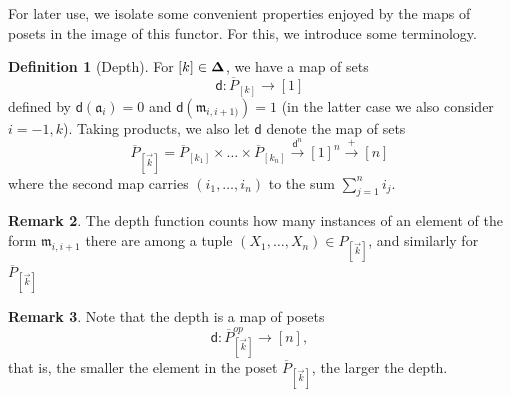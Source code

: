 \documentclass[10pt, reqno, twoside
, final
]{amsart}
\numberwithin{equation}{subsection}%
\theoremstyle{definition}
\newtheorem{defn}{Definition}[subsection]
\theoremstyle{definition}
\theoremstyle{definition}
\theoremstyle{definition}
\theoremstyle{definition}
\theoremstyle{definition}
\theoremstyle{definition}
\theoremstyle{definition}
\theoremstyle{definition}
\theoremstyle{plain}
\theoremstyle{definition}
\theoremstyle{plain}
\theoremstyle{definition}
\theoremstyle{plain}
\theoremstyle{definition}
\newtheorem{rmk}[defn]{Remark}
\theoremstyle{definition}
\theoremstyle{plain}
\theoremstyle{plain}
\theoremstyle{definition}
\theoremstyle{plain}
\theoremstyle{plain}
\theoremstyle{plain}
\begin{document}
For later use, we isolate some convenient properties enjoyed by the maps of posets in the image of this functor. For this, we introduce some terminology.
\begin{defn}[Depth]\label{defn:depth}
For $[k]\in\boldsymbol{\Delta}$, we have a map of sets
\[ \mathsf{d}:\overline{P}_{[k]}\longrightarrow [1] \]
defined by $\mathsf{d}(\mathfrak{a}_i)=0$ and $\mathsf{d}(\mathfrak{m}_{i, i+1)})=1$ (in the latter case we also consider $i=-1,k$). Taking products, we also let $\mathsf{d}$ denote the map of sets
\[ \overline{P}_{[\vec{k}]}=\overline{P}_{[k_1]}\times\ldots\times\overline{P}_{[k_n]}\overset{\mathsf{d}^n}{\longrightarrow} [1]^n\overset{+}{\longrightarrow} [n] \]
where the second map carries $(i_1,\ldots,i_n)$ to the sum $\sum_{j=1}^ni_j$.
\end{defn}
\begin{rmk}
The depth function counts how many instances of an element of the form $\mathfrak{m}_{i,i+1}$ there are among a tuple $(X_1,\ldots,X_n)\in P_{[\vec{k}]}$, and similarly for $\overline{P}_{[\vec{k}]}$
\end{rmk}
\begin{rmk}
Note that the depth is a map of posets 
\[ \mathsf{d}:\overline{P}_{[\vec{k}]}^{op}\longrightarrow [n],  \]
that is, the smaller the element in the poset $\overline{P}_{[\vec{k}]}$, the larger the depth.
\end{rmk}
\end{document}
